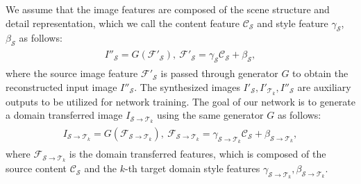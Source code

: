 We assume that the image features are composed of the scene structure and detail representation, which we call the content feature $\mathcal{C}_\mathcal{S}$ and style feature $\gamma_\mathcal{S}$, $\beta_\mathcal{S}$ as follows:
\begin{gather}
\begin{split}
I''_\mathcal{S} = G(\mathcal{F}'_\mathcal{S}),~\mathcal{F}'_\mathcal{S} = \gamma_\mathcal{S} \mathcal{C_S}  + \beta_\mathcal{S},
\end{split}
\label{eq:indirect_recon}
\end{gather}
where the source image feature $\mathcal{F}'_\mathcal{S}$ is passed through generator $G$ to obtain the reconstructed input image $I''_\mathcal{S}$.
The synthesized images $I'_\mathcal{S}, I'_{\mathcal{T}_k}, I''_\mathcal{S}$ are auxiliary outputs to be utilized for network training.
The goal of our network is to generate a domain transferred image $I_{\mathcal{S}\to{\mathcal{T}_k}}$ using the same generator $G$ as follows:
\begin{gather}
\begin{split}
I_{\mathcal{S}\to{\mathcal{T}_k}} = G(\mathcal{F}_{\mathcal{S}\to{\mathcal{T}_k}}),
~\mathcal{F}_{\mathcal{S}\to{\mathcal{T}_k}} = \gamma_{\mathcal{S}\to{\mathcal{T}_k}} \mathcal{C_S}  + \beta_{\mathcal{S}\to{\mathcal{T}_k}},
\end{split}
\label{eq:transfer}
\end{gather}
where $\mathcal{F}_{\mathcal{S}\to{\mathcal{T}_k}}$ is the domain transferred features, which is composed of the source content $\mathcal{C_S}$ and the $k$-th target domain style features $\gamma_{\mathcal{S}\to{\mathcal{T}_k}}, \beta_{\mathcal{S}\to{\mathcal{T}_k}}$.

